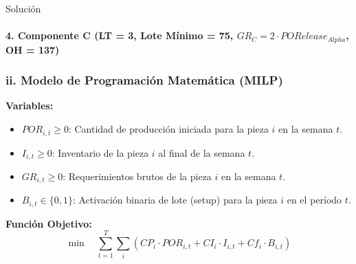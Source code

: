 \documentclass[11pt, a4paper]{article}
\begin{document}
\begin{ejercicio}{Solución}
  \paragraph{4. Componente C (LT = 3, Lote Mínimo = 75, $GR_C = 2 \cdot PORelease_{Alpha}$, OH = 137)}
  \begin{center}
  \end{center}

  \subsubsection*{ii. Modelo de Programación Matemática (MILP)}
  \textbf{Variables:}
  \begin{itemize}
    \item $POR_{i,t} \ge 0$: Cantidad de producción iniciada para la pieza $i$ en la semana $t$.
    \item $I_{i,t} \ge 0$: Inventario de la pieza $i$ al final de la semana $t$.
    \item $GR_{i,t} \ge 0$: Requerimientos brutos de la pieza $i$ en la semana $t$.
    \item $B_{i,t} \in \{0, 1\}$: Activación binaria de lote (setup) para la pieza $i$ en el período $t$.
  \end{itemize}

  \textbf{Función Objetivo:}
  \begin{equation*}
    \min \quad \sum_{t=1}^{T} \sum_{i} \left( CP_i \cdot POR_{i,t} + CI_i \cdot I_{i,t} + Cf_i \cdot B_{i,t} \right)
  \end{equation*}


\end{ejercicio}
\end{document}
